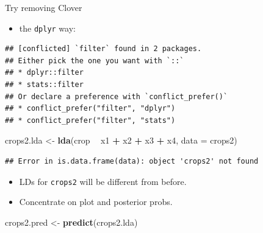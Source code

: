 \documentclass[ignorenonframetext,]{beamer}
\newenvironment{Shaded}{\begin{snugshade}}{\end{snugshade}}
\newcommand{\DataTypeTok}[1]{\textcolor[rgb]{0.13,0.29,0.53}{#1}}
\newcommand{\KeywordTok}[1]{\textcolor[rgb]{0.13,0.29,0.53}{\textbf{#1}}}
\newcommand{\NormalTok}[1]{#1}
\newcommand{\OperatorTok}[1]{\textcolor[rgb]{0.81,0.36,0.00}{\textbf{#1}}}
\newcommand{\StringTok}[1]{\textcolor[rgb]{0.31,0.60,0.02}{#1}}
\providecommand{\tightlist}{%
  \setlength{\itemsep}{0pt}\setlength{\parskip}{0pt}}
\begin{document}
\begin{frame}[fragile]{Try removing Clover}
\protect\hypertarget{try-removing-clover}{}

\begin{itemize}
\tightlist
\item
  the \texttt{dplyr} way:
\end{itemize}

\begin{Shaded}
\end{Shaded}

\begin{verbatim}
## [conflicted] `filter` found in 2 packages.
## Either pick the one you want with `::` 
## * dplyr::filter
## * stats::filter
## Or declare a preference with `conflict_prefer()`
## * conflict_prefer("filter", "dplyr")
## * conflict_prefer("filter", "stats")
\end{verbatim}

\begin{Shaded}
\begin{Highlighting}[]
\NormalTok{crops2.lda <-}\StringTok{ }\KeywordTok{lda}\NormalTok{(crop }\OperatorTok{~}\StringTok{ }\NormalTok{x1 }\OperatorTok{+}\StringTok{ }\NormalTok{x2 }\OperatorTok{+}\StringTok{ }\NormalTok{x3 }\OperatorTok{+}\StringTok{ }\NormalTok{x4, }\DataTypeTok{data =}\NormalTok{ crops2)}
\end{Highlighting}
\end{Shaded}

\begin{verbatim}
## Error in is.data.frame(data): object 'crops2' not found
\end{verbatim}

\begin{itemize}
\item
  LDs for \texttt{crops2} will be different from before.
\item
  Concentrate on plot and posterior probs.
\end{itemize}

\begin{Shaded}
\begin{Highlighting}[]
\NormalTok{crops2.pred <-}\StringTok{ }\KeywordTok{predict}\NormalTok{(crops2.lda)}
\end{Highlighting}
\end{Shaded}


\end{frame}
\end{document}

